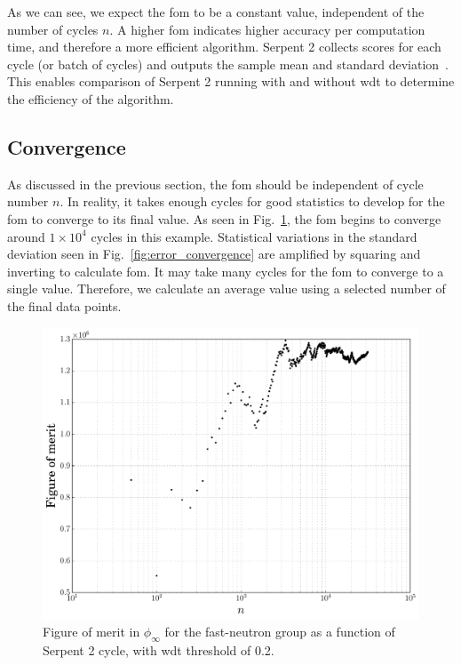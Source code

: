 As we can see, we expect the
\gls{fom} to be a constant value, independent of the number of cycles
$n$.  A higher \gls{fom} indicates higher accuracy per computation
time, and therefore a more efficient algorithm. Serpent 2 collects
scores for each cycle (or batch of cycles) and outputs the sample mean
and standard deviation~\cite{VTT-R-00371-14}. This enables comparison of Serpent 2
running with and without \gls{wdt} to determine the efficiency of the
algorithm.

\subsection{Convergence}
\label{sec:convergence}

As discussed in the previous section, the \gls{fom} should be
independent of cycle number $n$. In reality, it takes enough cycles
for good statistics to develop for the \gls{fom} to converge to its
final value. As seen in Fig.~\ref{fig:fom_convergence}, the \gls{fom}
begins to converge around $1\times 10^4$ cycles in this example. Statistical
variations in the standard deviation seen in
Fig.~\ref{fig:error_convergence} are amplified by squaring and
inverting to calculate \gls{fom}. 
It may take many cycles for the
\gls{fom} to converge to a single value. Therefore, we calculate an
average value using a selected number of the final data points.
\begin{figure}[hbtp]
  \centering
  \includegraphics[scale=0.5]{images/fom_convergence_example}
  \caption[Figure of merit in $\phi_{\infty}$ for the fast-neutron group as a
    function of Serpent 2 cycle.]{Figure of merit in $\phi_{\infty}$ for the fast-neutron group as a
    function of Serpent 2 cycle, with \gls{wdt} threshold of 0.2.}
  \label{fig:fom_convergence}
\end{figure}

